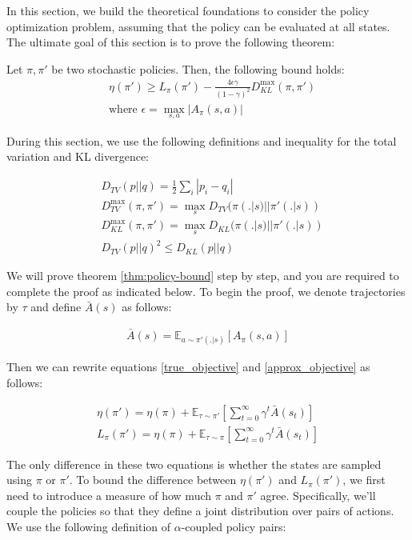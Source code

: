 In this section, we build the theoretical foundations to consider the policy optimization problem, assuming that the policy can be evaluated at all states. The ultimate goal of this section is to prove the following theorem:

\begin{theorem}\label{thm:policy-bound}
    Let $\pi, \pi'$ be two stochastic policies. Then, the following bound holds:
    \begin{align*}
    &\eta(\pi') \ge L_{\pi}(\pi') - \frac{4\epsilon\gamma}{(1-\gamma)^2}D_{KL}^{\max}(\pi, \pi') \\
    &\text{where } \epsilon = \max_{s, a} |A_{\pi}(s, a)|
    \end{align*}
\end{theorem}

During this section, we use the following definitions and inequality for the total variation and KL divergence:

\begin{align*}
    &D_{TV}(p||q) = \frac{1}{2}\sum_{i}|p_i - q_i| \\
    &D_{TV}^{\max}(\pi, \pi') = \max_{s} D_{TV}(\pi(.|s)||\pi'(.|s))\\
    &D_{KL}^{\max}(\pi, \pi') = \max_{s} D_{KL}(\pi(.|s)||\pi'(.|s))\\
    &D_{TV}(p||q)^2 \le D_{KL}(p||q)
\end{align*}

We will prove theorem \ref{thm:policy-bound} step by step, and you are required to complete the proof as indicated below. To begin the proof, we denote trajectories by $\tau$ and define $\bar{A}(s)$ as follows:

\begin{align*}
    \bar{A}(s) = \mathbb{E}_{a \sim \pi'(.|s)}[A_{\pi}(s, a)]
\end{align*}

Then we can rewrite equations \ref{true_objective} and \ref{approx_objective} as follows:

\begin{align}
    \eta(\pi') = \eta(\pi) + \mathbb{E}_{\tau \sim \pi'}[\sum_{t = 0}^{\infty}\gamma^t \bar{A}(s_t)] \\
    L_{\pi}(\pi') = \eta(\pi) + \mathbb{E}_{\tau \sim \pi}[\sum_{t = 0}^{\infty}\gamma^t \bar{A}(s_t)] 
\end{align}

The only difference in these two equations is whether the states are sampled using $\pi$ or $\pi'$. To bound the difference between $\eta(\pi')$ and $L_{\pi}(\pi')$, we first need to introduce a measure of how much $\pi$ and $\pi'$ agree. Specifically, we'll couple the policies so that they define a joint distribution over pairs of actions. We use the following definition of $\alpha$-coupled policy pairs:

